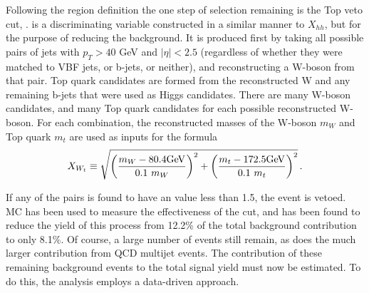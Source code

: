         \FloatBarrier
        Following the region definition the one step of selection remaining is the Top veto cut, \xwt.
        \xwt is a discriminating variable constructed in a similar manner to $X_{hh}$,
            but for the purpose of reducing the \ttbar background.
        It is produced first by taking all possible pairs of jets with $p_T > 40$ GeV and $|\eta| < 2.5$
            (regardless of whether they were matched to VBF jets, or b-jets, or neither),
            and reconstructing a W-boson from that pair.
        Top quark candidates are formed from the reconstructed W and any remaining b-jets that were used as Higgs candidates.
        There are many W-boson candidates, and many Top quark candidates for each possible reconstructed W-boson.
        For each combination, the reconstructed masses of the W-boson $m_W$ and Top quark $m_t$
            are used as inputs for the formula
        \begin{equation} \label{eq:xwt}
            \xwt \equiv \sqrt{\left(\frac{m_W - 80.4\textrm{GeV}}{0.1 \ m_W}\right)^{2}
                + \left(\frac{m_t - 172.5\textrm{GeV}}{0.1 \ m_t}\right)^{2}}
            \,.
        \end{equation}

        If any of the pairs is found to have an \xwt value less than 1.5, the event is vetoed. 
        \ttbar MC has been used to measure the effectiveness of the \xwt cut,
            and has been found to reduce the yield of this process from
            12.2\% of the total background contribution to only 8.1\%.
        Of course, a large number of \ttbar events still remain,
            as does the much larger contribution from QCD multijet events.
        The contribution of these remaining background events to the total signal yield
            must now be estimated.
        To do this, the analysis employs a data-driven approach.


